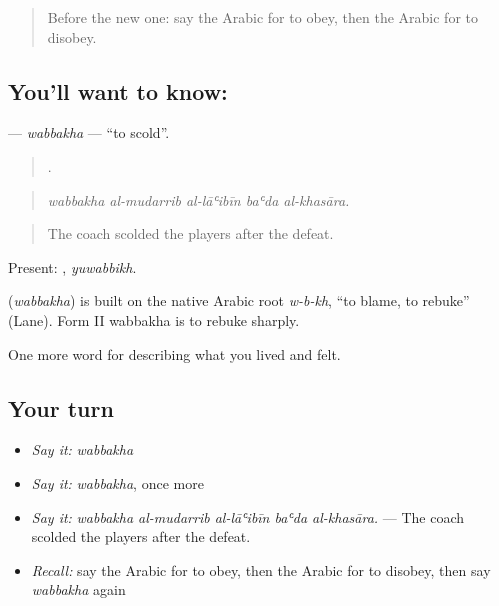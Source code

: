 \label{lesson:AR-C534-wabbakha}



\begin{quote}
Before the new one: say the Arabic for to obey, then the Arabic for to disobey.
\end{quote}

\subsection*{You'll want to know: }
\textbf{} — \emph{wabbakha} — \textquotedblleft{}to scold\textquotedblright{}.

\begin{quote}
    .
\end{quote}

\begin{quote}
\emph{wabbakha al-mudarrib al-lāʿibīn baʿda al-khasāra.}
\end{quote}

\begin{quote}
The coach scolded the players after the defeat.
\end{quote}

Present: , \emph{yuwabbikh}.

\begin{cousinweb}
\textbf{} (\emph{wabbakha}) is built on the native Arabic root \emph{w-b-kh}, \textquotedblleft{}to blame, to rebuke\textquotedblright{} (Lane). Form II wabbakha is to rebuke sharply.
\end{cousinweb}

\begin{grammarlens}[title={What you've built}]
One more word for describing what you lived and felt.
\end{grammarlens}

\subsection*{Your turn}
\begin{itemize}
\raggedright
  \item \emph{Say it:} \emph{wabbakha}
  \item \emph{Say it:} \emph{wabbakha}, once more
  \item \emph{Say it:} \emph{wabbakha al-mudarrib al-lāʿibīn baʿda al-khasāra.} — The coach scolded the players after the defeat.
  \item \emph{Recall:} say the Arabic for to obey, then the Arabic for to disobey, then say \emph{wabbakha} again
\end{itemize}

